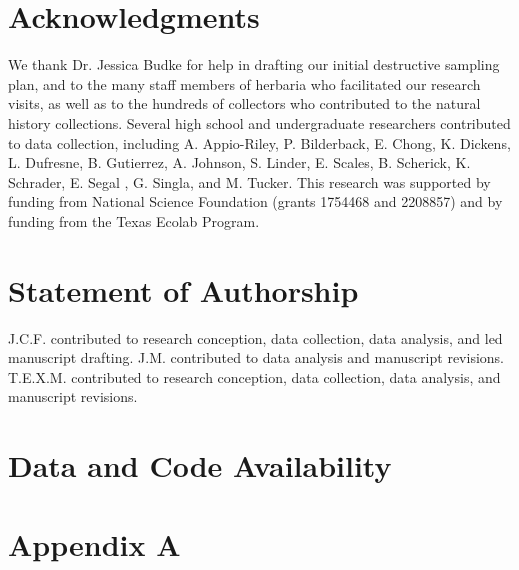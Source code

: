 \documentclass[11pt]{article}
\newcommand{\revise}[1]{{\color{black}{#1}}}
\begin{document}
	\section*{Acknowledgments}
	We thank Dr. Jessica Budke for help in drafting our initial destructive sampling plan, and to the many staff members of herbaria who facilitated our research visits, as well as to the hundreds of collectors who contributed to the natural history collections. 
	Several high school and undergraduate researchers contributed to data collection, including A. Appio-Riley, P. Bilderback, E. Chong, K. Dickens, L. Dufresne, B. Gutierrez, A. Johnson, S. Linder, E. Scales, B. Scherick, K. Schrader, E. Segal , G. Singla, and M. Tucker.
	This research was supported by funding from National Science Foundation (grants 1754468 and 2208857) and by funding from the Texas Ecolab Program.
\revise{Two anonymous reviewers greatly improved an earlier version of this manuscript.}


	
	\section*{Statement of Authorship}
J.C.F. contributed to research conception, data collection, data analysis, and led manuscript drafting.
J.M. contributed to data analysis and manuscript revisions.
T.E.X.M. contributed to research conception, data collection, data analysis, and manuscript revisions.

	
	\section*{Data and Code Availability}
\newpage{}
	
	
	
\newpage{}


	\section*{Appendix A}
	
\end{document}

